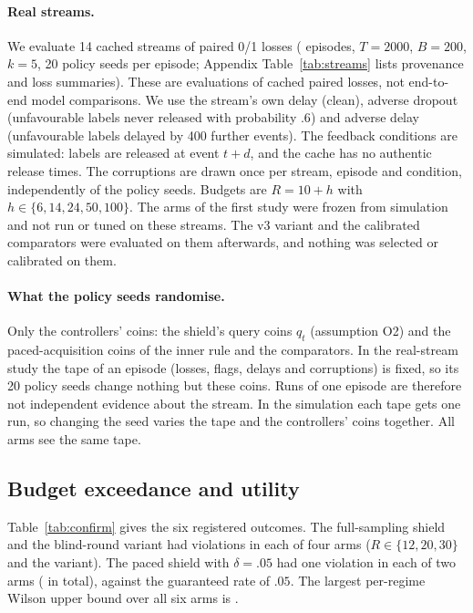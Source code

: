 \documentclass[10pt]{article}
\theoremstyle{plain}
\theoremstyle{definition}
\begin{document}
\paragraph{Real streams.}
We evaluate 14 cached streams of paired 0/1 losses (\NStreamEpisodes{} episodes, $T=2000$, $B=200$, $k=5$, 20 policy seeds per episode; Appendix Table~\ref{tab:streams} lists provenance and loss summaries). These are evaluations of cached paired losses, not end-to-end model comparisons. We use the stream's own delay (clean), adverse dropout (unfavourable labels never released with probability $.6$) and adverse delay (unfavourable labels delayed by 400 further events). The feedback conditions are simulated: labels are released at event $t+d$, and the cache has no authentic release times. The corruptions are drawn once per stream, episode and condition, independently of the policy seeds. Budgets are $R=10+h$ with $h\in\{6,14,24,50,100\}$. The arms of the first study were frozen from simulation and not run or tuned on these streams. The v3 variant and the calibrated comparators were evaluated on them afterwards, and nothing was selected or calibrated on them.

\paragraph{What the policy seeds randomise.}
Only the controllers' coins: the shield's query coins $q_t$ (assumption O2) and the paced-acquisition coins of the inner rule and the comparators. In the real-stream study the tape of an episode (losses, flags, delays and corruptions) is fixed, so its 20 policy seeds change nothing but these coins. Runs of one episode are therefore not independent evidence about the stream. In the simulation each tape gets one run, so changing the seed varies the tape and the controllers' coins together. All arms see the same tape.

\begin{table}[!htbp]
\caption{Simulation, $R=20$, pooled over \NRegimes{} regimes. $J$ is mean cost; ``vs never'' is the relative difference in $J$; harm quantiles are of $\sup_tH_t$. The exceedance columns report the mean of per-regime rates pooled across regimes and the rate in the worst regime, respectively. Full sampling has no violations; paced sampling has rare exceedances, while each heuristic comparator has a higher pooled rate.}\label{tab:sim}
\centering\small

\end{table}

\subsection{Budget exceedance and utility}
Table~\ref{tab:confirm} gives the six registered outcomes. The full-sampling shield and the blind-round variant had \COneTotal{} violations in each of four arms ($R\in\{12,20,30\}$ and the variant). The paced shield with $\delta=.05$ had one violation in each of two arms (\CTwoTotal{} in total), against the guaranteed rate of $.05$. The largest per-regime Wilson upper bound over all six arms is \CTwoMaxHi.
\end{document}
